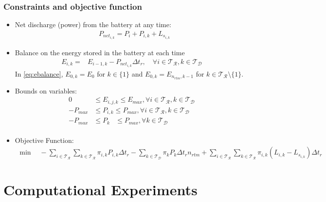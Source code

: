 \documentclass[11pt,twoside]{article}
\begin{document}
\subsubsection{Constraints and objective function}
\begin{itemize}
\item Net discharge (power) from the battery at any time:
\begin{align}
&P_{{net}_{i,k}} = P_{i} + P_{i,k} + L_{s_{i,k}}
\end{align}
\label{eq:Pnet}
\item Balance on the energy stored in the battery at each time
\begin{align}
E_{i,k} =& E_{i-1,k}- P_{{net}_{i,k}}\Delta t_r, \quad \forall i \in \mathcal{T_R}, k \in \mathcal{T_D}
\end{align}
\label{eq:ebalance}
In \ref{eq:ebalance}, $E_{0,k} = E_{0}$ for $k \in \lbrace1\rbrace$ and $E_{0,k} = E_{n_{rtm},k-1}$ for $k \in \mathcal{T_R}\setminus{\lbrace1\rbrace}$. 
\item Bounds on variables:
\begin{subequations}
\begin{align}
0 & \leq E_{i,j,k} \leq E_{max}, \forall i \in \mathcal{T_R}, k \in \mathcal{T_D}\\
-P_{max} & \leq P_{i,k} \leq P_{max}, \forall i \in \mathcal{T_R}, k \in \mathcal{T_D}\\
-P_{max} & \leq P_{k}\phantom{i,} \leq P_{max}, \forall k \in \mathcal{T_D}\\
\end{align}
\label{eq:bounds}
\end{subequations}
\item Objective Function:
\begin{align}
\min \quad -\sum\limits_{i \in \mathcal{T_R}}\sum\limits_{k \in \mathcal{T_R}} \pi_{i,k}P_{i,k}\Delta t_r - \sum\limits_{k \in \mathcal{T_D}}\pi_{k}P_{k}\Delta t_r n_{rtm} + \sum\limits_{i \in \mathcal{T_R}}\sum\limits_{k \in \mathcal{T_R}} \pi_{i,k}(L_{i,k}-L_{s_{i,k}})\Delta t_r
\end{align}
\label{objective}
\end{itemize}

\section{Computational Experiments}\label{sec:exp}
\end{document}
